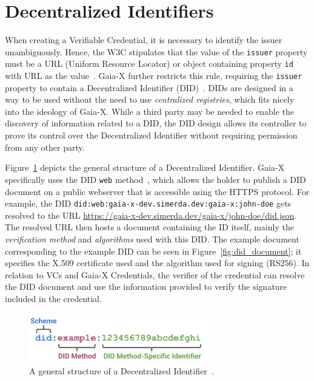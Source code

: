 \section{Decentralized Identifiers}\label{sec:decentralized-identifiers}

When creating a Verifiable Credential, it is necessary to identify the issuer unambiguously.
Hence, the W3C stipulates that the value of the \texttt{issuer} property must be a URL (Uniform Resource Locator) or object containing property \texttt{id} with URL as the value~\cite{verifiable_credentials}.
Gaia-X further restricts this rule, requiring the \texttt{issuer} property to contain a Decentralized Identifier (DID)~\cite{did}.
DIDs are designed in a way to be used without the need to use \textit{centralized registries}, which fits nicely into the ideology of Gaia-X.
While a third party may be needed to enable the discovery of information related to a DID, the DID design allows its controller to prove its control over the Decentralized Identifier without requiring permission from any other party.

Figure~\ref{fig:did_structure} depicts the general structure of a Decentralized Identifier.
Gaia-X specifically uses the DID \texttt{web} method~\cite{didweb}, which allows the holder to publish a DID document on a public webserver that is accessible using the HTTPS protocol.
For example, the DID \texttt{did:web:gaia-x-dev.simerda.dev:gaia-x:john-doe} gets resolved to the URL \url{https://gaia-x-dev.simerda.dev/gaia-x/john-doe/did.json}.
The resolved URL then hosts a document containing the ID itself, mainly the \textit{verification method} and \textit{algorithms} used with this DID.
The example document corresponding to the example DID can be seen in Figure~\ref{fig:did_document}; it specifies the X.509 certificate used and the algorithm used for signing (RS256).
In relation to VCs and Gaia-X Credentials, the verifier of the credential can resolve the DID document and use the information provided to verify the signature included in the credential.

\begin{figure}
    \centering
    \includegraphics[width=0.7\textwidth]{figures/parts-of-a-did.png}
    \caption{A general structure of a Decentralized Identifier~\cite{did}.}\label{fig:did_structure}
\end{figure}

